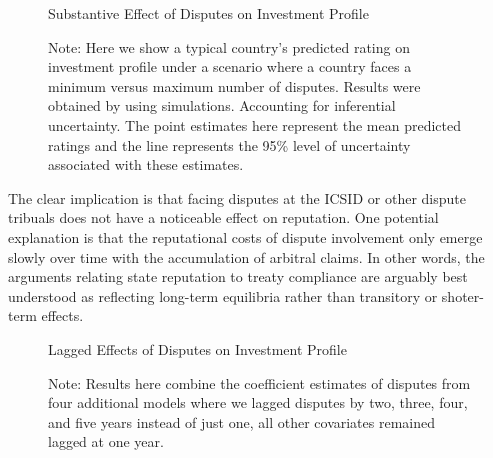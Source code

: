 \documentclass[12pt,onesided]{amsart}
\begin{document}

\begin{figure}[ht]
	\vspace{4cm}
	\centering
	\caption{Substantive Effect of Disputes on Investment Profile}
	\label{fig:subEffect}
	\resizebox{1\textwidth}{!}{}
	\caption*{Note: Here we show a typical country's predicted rating on investment profile under a scenario where a country faces a minimum versus maximum number of disputes. Results were obtained by using simulations. Accounting for inferential uncertainty. The point estimates here represent the mean predicted ratings and the line represents the 95\% level of uncertainty associated with these estimates.}
\end{figure}


The clear implication is that facing disputes at the ICSID or other dispute tribuals does not have a noticeable effect on reputation. One potential explanation is that the reputational costs of dispute involvement only emerge slowly over time with the accumulation of arbitral claims. In other words, the arguments relating state reputation to treaty compliance are arguably best understood as reflecting long-term equilibria rather than transitory or shoter-term effects.


\begin{figure}[ht]
	\vspace{3cm}
	\centering
	\caption{Lagged Effects of Disputes on Investment Profile}
	\label{fig:lagEffect}
	\resizebox{1\textwidth}{!}{}	
	\caption*{Note: Results here combine the coefficient estimates of disputes from four additional models where we lagged disputes by two, three, four, and five years instead of just one, all other covariates remained lagged at one year.}
\end{figure}

\end{document}

